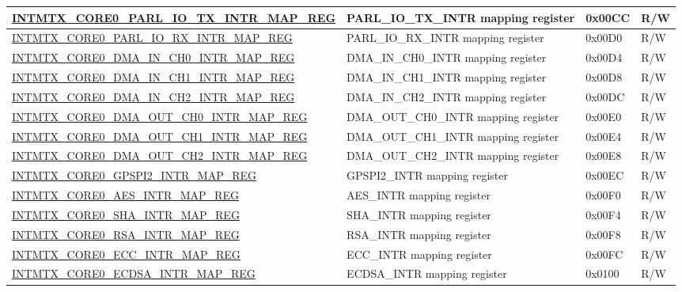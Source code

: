 \begin{longtable}{ | p{10cm} | p{10cm} | p{1.3cm} | p{1cm} | }
\hyperref[regdesc:INTMTXCORE0PARLIOTXINTRMAPREG]{INTMTX\_CORE0\_PARL\_IO\_TX\_INTR\_MAP\_REG} & PARL\_IO\_TX\_INTR mapping register & 0x00CC & R/W \\ \hline
\hyperref[regdesc:INTMTXCORE0PARLIORXINTRMAPREG]{INTMTX\_CORE0\_PARL\_IO\_RX\_INTR\_MAP\_REG} & PARL\_IO\_RX\_INTR mapping register & 0x00D0 & R/W \\ \hline
\hyperref[regdesc:INTMTXCORE0DMAINCH0INTRMAPREG]{INTMTX\_CORE0\_DMA\_IN\_CH0\_INTR\_MAP\_REG} & DMA\_IN\_CH0\_INTR mapping register & 0x00D4 & R/W \\ \hline
\hyperref[regdesc:INTMTXCORE0DMAINCH1INTRMAPREG]{INTMTX\_CORE0\_DMA\_IN\_CH1\_INTR\_MAP\_REG} & DMA\_IN\_CH1\_INTR mapping register & 0x00D8 & R/W \\ \hline
\hyperref[regdesc:INTMTXCORE0DMAINCH2INTRMAPREG]{INTMTX\_CORE0\_DMA\_IN\_CH2\_INTR\_MAP\_REG} & DMA\_IN\_CH2\_INTR mapping register & 0x00DC & R/W \\ \hline
\hyperref[regdesc:INTMTXCORE0DMAOUTCH0INTRMAPREG]{INTMTX\_CORE0\_DMA\_OUT\_CH0\_INTR\_MAP\_REG} & DMA\_OUT\_CH0\_INTR mapping register & 0x00E0 & R/W \\ \hline
\hyperref[regdesc:INTMTXCORE0DMAOUTCH1INTRMAPREG]{INTMTX\_CORE0\_DMA\_OUT\_CH1\_INTR\_MAP\_REG} & DMA\_OUT\_CH1\_INTR mapping register & 0x00E4 & R/W \\ \hline
\hyperref[regdesc:INTMTXCORE0DMAOUTCH2INTRMAPREG]{INTMTX\_CORE0\_DMA\_OUT\_CH2\_INTR\_MAP\_REG} & DMA\_OUT\_CH2\_INTR mapping register & 0x00E8 & R/W \\ \hline
\hyperref[regdesc:INTMTXCORE0GPSPI2INTRMAPREG]{INTMTX\_CORE0\_GPSPI2\_INTR\_MAP\_REG} & GPSPI2\_INTR mapping register & 0x00EC & R/W \\ \hline
\hyperref[regdesc:INTMTXCORE0AESINTRMAPREG]{INTMTX\_CORE0\_AES\_INTR\_MAP\_REG} & AES\_INTR mapping register & 0x00F0 & R/W \\ \hline
\hyperref[regdesc:INTMTXCORE0SHAINTRMAPREG]{INTMTX\_CORE0\_SHA\_INTR\_MAP\_REG} & SHA\_INTR mapping register & 0x00F4 & R/W \\ \hline
\hyperref[regdesc:INTMTXCORE0RSAINTRMAPREG]{INTMTX\_CORE0\_RSA\_INTR\_MAP\_REG} & RSA\_INTR mapping register & 0x00F8 & R/W \\ \hline
\hyperref[regdesc:INTMTXCORE0ECCINTRMAPREG]{INTMTX\_CORE0\_ECC\_INTR\_MAP\_REG} & ECC\_INTR mapping register & 0x00FC & R/W \\ \hline
\hyperref[regdesc:INTMTXCORE0ECDSAINTRMAPREG]{INTMTX\_CORE0\_ECDSA\_INTR\_MAP\_REG} & ECDSA\_INTR mapping register & 0x0100 & R/W \\ \hline

\end{longtable}
